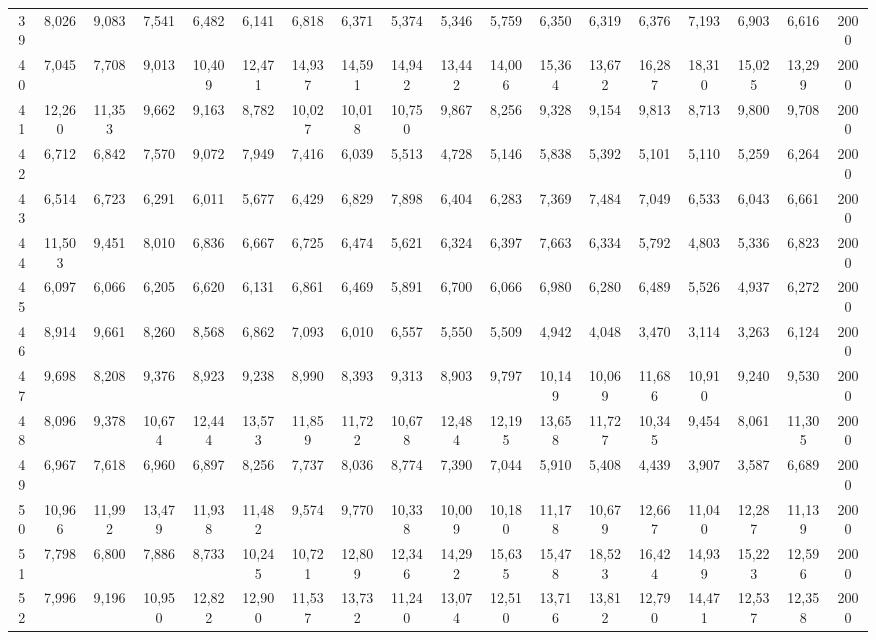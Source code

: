 {\begin{longtable}{ >{\tiny}cccccccccccccccccc}
39  & 8,026  & 9,083  & 7,541  & 6,482  & 6,141  & 6,818  & 6,371  & 5,374  & 5,346  & 5,759  & 6,350  & 6,319  & 6,376  & 7,193  & 6,903  & 6,616  & 2000 \\
40  & 7,045  & 7,708  & 9,013  & 10,409 & 12,471 & 14,937 & 14,591 & 14,942 & 13,442 & 14,006 & 15,364 & 13,672 & 16,287 & 18,310 & 15,025 & 13,299 & 2000 \\
41  & 12,260 & 11,353 & 9,662  & 9,163  & 8,782  & 10,027 & 10,018 & 10,750 & 9,867  & 8,256  & 9,328  & 9,154  & 9,813  & 8,713  & 9,800  & 9,708  & 2000 \\
42  & 6,712  & 6,842  & 7,570  & 9,072  & 7,949  & 7,416  & 6,039  & 5,513  & 4,728  & 5,146  & 5,838  & 5,392  & 5,101  & 5,110  & 5,259  & 6,264  & 2000 \\
43  & 6,514  & 6,723  & 6,291  & 6,011  & 5,677  & 6,429  & 6,829  & 7,898  & 6,404  & 6,283  & 7,369  & 7,484  & 7,049  & 6,533  & 6,043  & 6,661  & 2000 \\
44  & 11,503 & 9,451  & 8,010  & 6,836  & 6,667  & 6,725  & 6,474  & 5,621  & 6,324  & 6,397  & 7,663  & 6,334  & 5,792  & 4,803  & 5,336  & 6,823  & 2000 \\
45  & 6,097  & 6,066  & 6,205  & 6,620  & 6,131  & 6,861  & 6,469  & 5,891  & 6,700  & 6,066  & 6,980  & 6,280  & 6,489  & 5,526  & 4,937  & 6,272  & 2000 \\
46  & 8,914  & 9,661  & 8,260  & 8,568  & 6,862  & 7,093  & 6,010  & 6,557  & 5,550  & 5,509  & 4,942  & 4,048  & 3,470  & 3,114  & 3,263  & 6,124  & 2000 \\
47  & 9,698  & 8,208  & 9,376  & 8,923  & 9,238  & 8,990  & 8,393  & 9,313  & 8,903  & 9,797  & 10,149 & 10,069 & 11,686 & 10,910 & 9,240  & 9,530  & 2000 \\
48  & 8,096  & 9,378  & 10,674 & 12,444 & 13,573 & 11,859 & 11,722 & 10,678 & 12,484 & 12,195 & 13,658 & 11,727 & 10,345 & 9,454  & 8,061  & 11,305 & 2000 \\
49  & 6,967  & 7,618  & 6,960  & 6,897  & 8,256  & 7,737  & 8,036  & 8,774  & 7,390  & 7,044  & 5,910  & 5,408  & 4,439  & 3,907  & 3,587  & 6,689  & 2000 \\
50  & 10,966 & 11,992 & 13,479 & 11,938 & 11,482 & 9,574  & 9,770  & 10,338 & 10,009 & 10,180 & 11,178 & 10,679 & 12,667 & 11,040 & 12,287 & 11,139 & 2000 \\
51  & 7,798  & 6,800  & 7,886  & 8,733  & 10,245 & 10,721 & 12,809 & 12,346 & 14,292 & 15,635 & 15,478 & 18,523 & 16,424 & 14,939 & 15,223 & 12,596 & 2000 \\
52  & 7,996  & 9,196  & 10,950 & 12,822 & 12,900 & 11,537 & 13,732 & 11,240 & 13,074 & 12,510 & 13,716 & 13,812 & 12,790 & 14,471 & 12,537 & 12,358 & 2000 \\

\end{longtable}}
